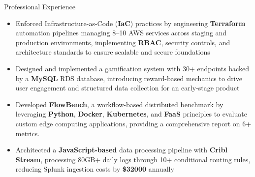 \documentclass{resume}
\begin{document}
    \begin{experienceSection}{Professional Experience}
    \experienceItem[
        company={DriverAI LLC},
        location={Remote},
        position={Software Engineer - AWS Lead},
        duration={Dec 2025 - Present}
    ]
    \begin{itemize}
        \itemsep -6pt {}
        \item Enforced Infrastructure-as-Code (\textbf{IaC}) practices by engineering \textbf{Terraform} automation pipelines managing 8–10 AWS services across staging and production environments, implementing \textbf{RBAC}, security controls, and architecture standards to ensure scalable and secure foundations
        \item Designed and implemented a gamification system with 30+ endpoints backed by a \textbf{MySQL} RDS database, introducing reward-based mechanics to drive user engagement and structured data collection for an early-stage product
    \end{itemize}

    \experienceItem[
        company={Arizona State University},
        location={Remote},
        position={Research Assistant, VISA Lab},
        duration={Jun 2025 - December 2025}
    ]
    \begin{itemize}
        \itemsep -6pt {}
        \item Developed \textbf{FlowBench}, a workflow-based distributed benchmark by leveraging \textbf{Python}, \textbf{Docker}, \textbf{Kubernetes}, and \textbf{FaaS} principles to evaluate custom edge computing applications, providing a comprehensive report on 6+ metrics.
    \end{itemize}

    \experienceItem[
        company={Arch Mortgage Insurance},
        location={Greensboro, NC},
        position={Software Engineer (Infrastructure \& Reliability) Intern},
        duration={Jun 2024 - Aug 2024}
    ]
    \begin{itemize}
        \itemsep -6pt {}
        \item Architected a \textbf{JavaScript-based} data processing pipeline with \textbf{Cribl Stream}, processing 80GB+ daily logs through 10+ conditional routing rules, reducing Splunk ingestion costs by \textbf{\$32000} annually
        
    \end{itemize}


\end{experienceSection}
\end{document}
